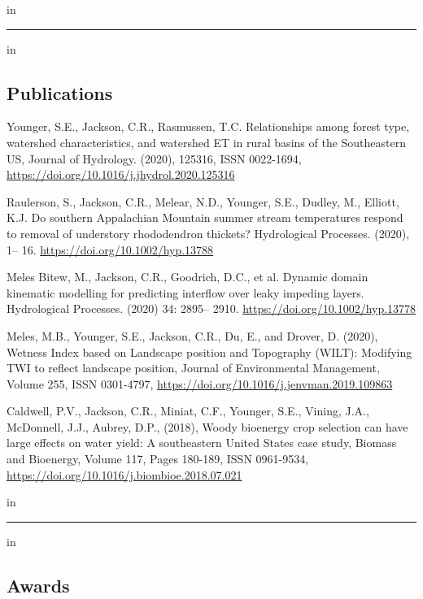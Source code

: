 \documentclass[10pt,letterpaper]{article}
\begin{document}
	\vspace{-0.4em}
	 in
	
	\hrule
	\vspace{-0.4em}
	 in
	\subsection*{Publications}
	
	\begin{hangparas}{.25in}{1}
		
		Younger, S.E., Jackson, C.R., Rasmussen, T.C. Relationships among forest type, watershed characteristics, and watershed ET in rural basins of the Southeastern US,
		Journal of Hydrology. (2020), 125316, ISSN 0022-1694, \url{https://doi.org/10.1016/j.jhydrol.2020.125316}
		
		Raulerson, S., Jackson, C.R., Melear, N.D., Younger, S.E., Dudley, M., Elliott, K.J. Do southern Appalachian Mountain summer stream temperatures respond to removal of understory rhododendron thickets? Hydrological Processes. (2020), 1– 16. \url{https://doi.org/10.1002/hyp.13788}
		
		Meles Bitew, M., Jackson, C.R., Goodrich, D.C., et al. Dynamic domain kinematic modelling for predicting interflow over leaky impeding layers. Hydrological Processes. (2020) 34: 2895– 2910. \url{https://doi.org/10.1002/hyp.13778}
		
		Meles, M.B., Younger, S.E., Jackson, C.R., Du, E., and Drover, D. (2020), Wetness Index based on Landscape position and Topography (WILT): Modifying TWI to reflect landscape position, Journal of Environmental Management, Volume 255, ISSN 0301-4797, \url{https://doi.org/10.1016/j.jenvman.2019.109863}
		
		Caldwell, P.V., Jackson, C.R., Miniat, C.F., Younger, S.E., Vining, J.A., McDonnell, J.J., Aubrey, D.P., (2018), Woody bioenergy crop selection can have large effects on water yield: A southeastern United States case study,
		Biomass and Bioenergy, Volume 117, Pages 180-189, ISSN 0961-9534, \url{https://doi.org/10.1016/j.biombioe.2018.07.021}
		
		 in
		\vspace{-0.4em}
		
	\end{hangparas}
	
	\hrule
	\vspace{-0.4em}
	 in
	\subsection*{Awards}
	
\end{document}
